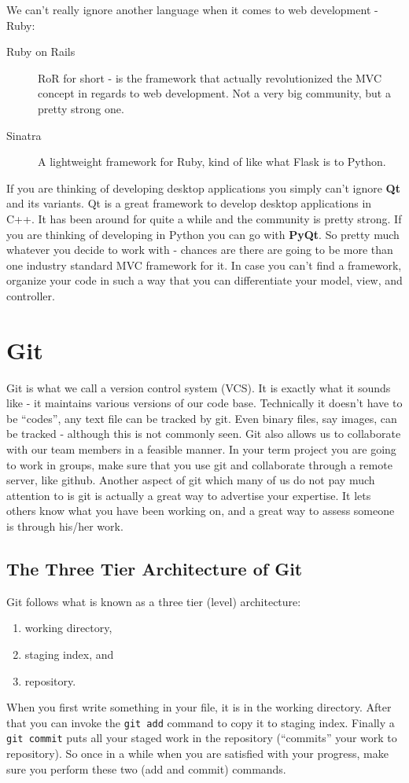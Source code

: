 \documentclass{article}
\begin{document}
We can't really ignore another language when it comes to web development - Ruby:
\begin{description}
	\item[Ruby on Rails] RoR for short - is the framework that actually revolutionized the MVC concept in regards to web development.
		Not a very big community, but a pretty strong one.
	\item[Sinatra] A lightweight framework for Ruby, kind of like what Flask is to Python.
\end{description}
If you are thinking of developing desktop applications you simply can't ignore \textbf{Qt} and its variants.
Qt is a great framework to develop desktop applications in C++. It has been around for quite a while and the community is pretty strong.
If you are thinking of developing in Python you can go with \textbf{PyQt}.
So pretty much whatever you decide to work with - chances are there are going to be more than one industry standard MVC framework for it.
In case you can't find a framework, organize your code in such a way that you can differentiate your model, view, and controller.

\section{Git}
Git is what we call a version control system (VCS).
It is exactly what it sounds like - it maintains various versions of our code base.
Technically it doesn't have to be ``codes'', any text file can be tracked by git.
Even binary files, say images, can be tracked - although this is not commonly seen.
Git also allows us to collaborate with our team members in a feasible manner.
In your term project you are going to work in groups, make sure that you use git and collaborate through a remote server, like github.
Another aspect of git which many of us do not pay much attention to is git is actually a great way to advertise your expertise.
It lets others know what you have been working on, and a great way to assess someone is through his/her work.

\subsection{The Three Tier Architecture of Git}
Git follows what is known as a three tier (level) architecture:
\begin{enumerate}
	\item working directory,
	\item staging index, and
	\item repository.
\end{enumerate}
When you first write something in your file, it is in the working directory.
After that you can invoke the \verb|git add| command to copy it to staging index.
Finally a \verb|git commit| puts all your staged work in the repository (``commits'' your work to repository).
So once in a while when you are satisfied with your progress, make sure you perform these two (add and commit) commands.
\end{document}
